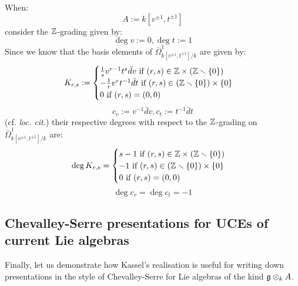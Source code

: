 \begin{remark}
            When:
                $$A := k[v^{\pm 1}, t^{\pm 1}]$$
            consider the $\mathbb{Z}$-grading given by:
                $$\deg v := 0, \deg t := 1$$
            Since we know that the basis elements of $\bar{\Omega}^1_{k[v^{\pm 1}, t^{\pm 1}]/k}$ are given by:
                $$
                    K_{r, s} :=
                    \begin{cases}
                        \text{$\frac1s v^{r - 1} t^s \bar{d}v$ if $(r, s) \in \Z \x (\Z \setminus \{0\})$}
                        \\
                        \text{$-\frac1r v^r t^{-1} \bar{d}t$ if $(r, s) \in (\Z \setminus \{0\}) \x \{0\}$}
                        \\
                        \text{$0$ if $(r, s) = (0, 0)$}
                    \end{cases}
                $$
                $$c_v := v^{-1} \bar{d}v, c_t := t^{-1} \bar{d}t$$
            (cf. \textit{loc. cit.}) their respective degrees with respect to the $\mathbb{Z}$-grading on $\bar{\Omega}^1_{k[v^{\pm 1}, t^{\pm 1}]/k}$ are:
                $$
                    \deg K_{r, s} =
                    \begin{cases}
                        \text{$s - 1$ if $(r, s) \in \Z \x (\Z \setminus \{0\})$}
                        \\
                        \text{$-1$ if $(r, s) \in (\Z \setminus \{0\}) \x \{0\}$}
                        \\
                        \text{$0$ if $(r, s) = (0, 0)$}
                    \end{cases}
                $$
                $$\deg c_v = \deg c_t = -1$$
        \end{remark}

    \subsection{Chevalley-Serre presentations for UCEs of current Lie algebras}
        Finally, let us demonstrate how Kassel's realisation is useful for writing down presentations in the style of Chevalley-Serre for Lie algebras of the kind $\g \tensor_k A$.

